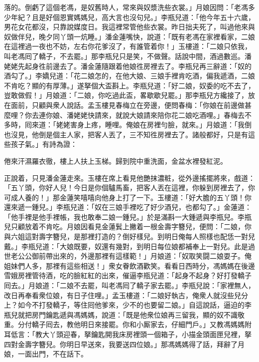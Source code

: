 落的。倒虧了這個老馮，是奴舊時人，常來與奴漿洗些衣裳。」月娘因問：「老馮多少年紀？且是好個恩實媽媽兒，高大言也沒句兒。」李瓶兒道：「他今年五十六歲，男花女花都沒，只靠說媒度日。我這裡常管他些衣裳。昨日拙夫死了，叫過他來與奴做伴兒，晚夕同丫頭一炕睡。」潘金蓮嘴快，說道：「既有老馮在家裡看家，二娘在這裡過一夜也不妨，左右你花爹沒了，有誰管着你！」{}玉樓道：「二娘只依我，叫老馮囘了轎子，不去罷。」那李瓶兒只是笑，不做聲。{}話說中間，酒過數巡。潘姥姥先起身徃前邊去了。潘金蓮隨跟着他娘徃房裡去了。李瓶兒再三辭道：「奴的酒勾了。」李嬌兒道：「花二娘怎的，在他大娘、三娘手裡肯吃酒，偏我遞酒，二娘不肯吃？顯的有厚薄。」遂拏個大盃斟上。李瓶兒道：「好二娘，奴委的吃不去了，豈敢做假！」月娘道：「二娘，你吃過此盃，畧歇歇兒罷。」那李瓶兒方纔接了，放在面前，只顧與衆人說話。孟玉樓見春梅立在旁邊，便問春梅：「你娘在前邊做甚麼哩？{}你去連你娘、潘姥姥快請來，就說大娘請來陪你花二娘吃酒哩。」春梅去不多時，囘來道：「姥姥害身上疼，睡哩。俺娘在房裡勻臉，就來。」月娘道：「我倒也沒見，他倒是個主人家，把客人丟了，三不知徃房裡去了。諸般都好，只是有這些孩子氣。」{}有詩為證：

倦來汗濕羅衣徹，樓上人扶上玉梯。歸到院中重洗面，金盆水裡發紅泥。

正說着，只見潘金蓮走來。玉樓在席上看見他艷抹濃粧，從外邊搖擺將來，戲道：「五丫頭，你好人兒！今日是你個驢馬畜，把客人丟在這裡，你躲到房裡去了，你可成人養的！」那金蓮笑嘻嘻向他身上打了一下。{}玉樓道：「好大膽的五丫頭！你還來遞一鍾兒。」李瓶兒道：「奴在三娘手裡吃了好少酒兒，也都勾了。」金蓮道：「他手裡是他手裡帳，我也敢奉二娘一鍾兒。」於是滿斟一大鍾遞與李瓶兒。李瓶兒只顧放着不肯吃。月娘因看見金蓮鬂上撇着一根金壽字簪兒，便問：「二娘，你與六姐這對壽字簪兒，是那裡打造的？倒好樣兒。到明日俺每人照樣也配恁一對兒戴。」李瓶兒道：「大娘既要，奴還有幾對，到明日每位娘都補奉上一對兒。此是過世老公公御前帶出來的，外邊那裡有這樣範！」月娘道：「奴取笑闘二娘耍子。俺姐妹們人多，那裡有這些相送！」衆女眷飲酒歡笑。看看日西時分，馮媽媽在後邊雪娥房裡管待酒，吃的臉紅紅的出來，催逼李瓶兒道：「起身不起身？好打發轎子囘去。」月娘道：「二娘不去罷，叫老馮囘了轎子家去罷。」李瓶兒說：「家裡無人，改日再奉看衆位娘，有日子住哩。」孟玉樓道：「二娘好執古，俺衆人就沒些兒分上？如今不打發轎子，等住囘他爹來，少不的也要留二娘。」{}自這說話，逼迫的李瓶兒就把房門鑰匙遞與馮媽媽，說道：「既是他衆位娘再三留我，顯的奴不識敬重。分付轎子囘去，教他明日來接罷。你和小厮家去，仔細門戶。」又教馮媽媽附耳低言：「教大丫頭迎春，拏鑰匙開我床房裡頭一個箱子，小描金頭面匣兒裡，拏四對金壽字簪兒。你明日早送來，我要送四位娘。」那馮媽媽得了話，拜辭了月娘，一面出門，不在話下。

